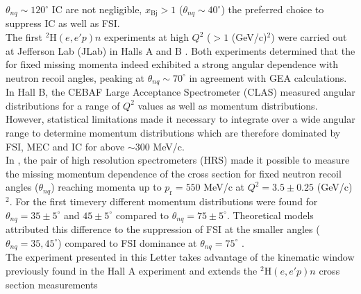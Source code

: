 $\theta_{nq}\sim120^{\circ}$ \DIFaddbegin {}\DIFaddend IC are not negligible, \DIFaddbegin {}\DIFaddend $x_{\mathrm{Bj}}>1$ (\DIFdelbegin {}\DIFdelend $\theta_{nq}\sim40^{\circ}$) \DIFdelbegin {}\DIFdelend \DIFaddbegin {}\DIFaddend the preferred choice to suppress IC as well as FSI. \\
\indent The first $^{2}\mathrm{H}(e,e'p)n$ experiments at high $Q^{2}$ ($>1$ (GeV/c)$^{2}$) were carried out at Jefferson Lab (JLab) in Halls A \cite{PhysRevLett.107.262501} and B \cite{PhysRevLett.98.262502}. Both
experiments determined that the \DIFdelbegin {}\DIFdelend \DIFaddbegin {}\DIFaddend for fixed missing momenta indeed exhibited a strong angular dependence with neutron recoil angles, peaking
at $\theta_{nq} \sim 70^{\circ}$ in agreement with GEA \cite{Sargsian_2001,PhysRevC.56.1124} calculations. In Hall B, the CEBAF Large Acceptance Spectrometer (CLAS) measured angular
distributions for  a range of $Q^2$ values as well as momentum distributions. However, statistical limitations made it necessary to integrate over a wide angular range to determine momentum distributions
which are therefore dominated by  FSI, MEC and IC for \DIFdelbegin {}\DIFdelend \DIFaddbegin {}\DIFaddend above $\sim 300$ MeV/c. \\
\indent In \DIFdelbegin {}\DIFdelend \DIFaddbegin {}\DIFaddend , the pair of high resolution spectrometers (HRS) made it possible to measure the missing momentum dependence of the cross section for fixed neutron recoil angles ($\theta_{nq}$)
reaching \DIFdelbegin {}\DIFdelend \DIFaddbegin {}\DIFaddend momenta up to $p_{\mathrm{r}}=550$ MeV/c at $Q^{2}=3.5\pm0.25$ (GeV/c)$^{2}$. For the first time\DIFaddbegin \DIFadd{, }\DIFaddend very different momentum distributions were found for $\theta_{nq}=35\pm5^{\circ}$
and $45\pm5^{\circ}$ compared to  $\theta_{nq}=75\pm5^{\circ}$. Theoretical models attributed this difference  to the suppression of FSI at the smaller angles ($\theta_{nq}=35, 45^{\circ}$) compared to FSI
dominance at $\theta_{nq}=75^{\circ}$ \cite{PhysRevLett.107.262501}. \\
\indent The experiment presented in this Letter takes advantage of the kinematic window previously found in the Hall A experiment \DIFaddbegin {}\DIFaddend and extends the $^{2}\mathrm{H}(e,e'p)n$ cross section measurements
